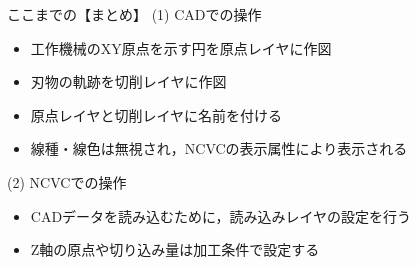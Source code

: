 \vspace*{2zh}
\begin{itembox}[l]{ここまでの【まとめ】}
(1) CADでの操作
\begin{itemize}
\item 工作機械のXY原点を示す円を原点レイヤに作図
\item 刃物の軌跡を切削レイヤに作図
\item 原点レイヤと切削レイヤに名前を付ける
\item 線種・線色は無視され，NCVCの表示属性により表示される
\end{itemize}
(2) NCVCでの操作
\begin{itemize}
\item CADデータを読み込むために，読み込みレイヤの設定を行う
\item Z軸の原点や切り込み量は加工条件で設定する
\end{itemize}
\end{itembox}
